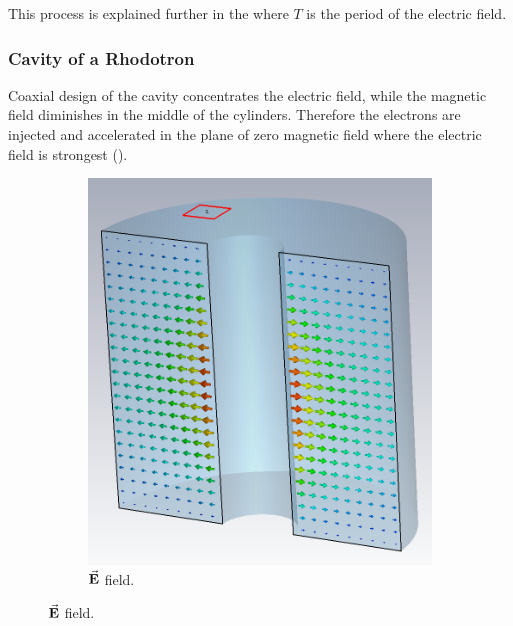 \documentclass{article}
\begin{document}
This process is explained further in the  where $T$ is the period of the electric field.

\subsubsection{Cavity of a Rhodotron} \label{sec:cavity_of_a_rhodotron}

Coaxial design of the cavity concentrates the electric field, while the magnetic field diminishes in the middle of the cylinders. 
Therefore the electrons are injected and accelerated in the plane of zero magnetic field where the electric field is strongest ().

\iffalse \begin{figure}[H]
    \centering
    \begin{subfigure}{0.45\textwidth}
        \centering
        \includegraphics[width=\linewidth]{../../../figures/cst/cavity_E_field_dist.png}
        \caption*{$\vec{\textbf{E}}$ field.}
    \end{subfigure}

\end{figure}
\end{document}

